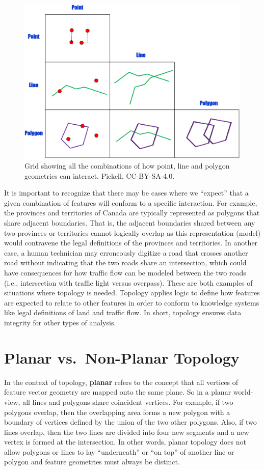 \documentclass[
]{book}
\begin{document}
\begin{figure}
\includegraphics[width=0.75\linewidth]{images/07-topology-grid} \caption{Grid showing all the combinations of how point, line and polygon geometries can interact. Pickell, CC-BY-SA-4.0.}\label{fig:7-topology-grid}
\end{figure}

It is important to recognize that there may be cases where we ``expect'' that a given combination of features will conform to a specific interaction. For example, the provinces and territories of Canada are typically represented as polygons that share adjacent boundaries. That is, the adjacent boundaries shared between any two provinces or territories cannot logically overlap as this representation (model) would contravene the legal definitions of the provinces and territories. In another case, a human technician may erroneously digitize a road that crosses another road without indicating that the two roads share an intersection, which could have consequences for how traffic flow can be modeled between the two roads (i.e., intersection with traffic light versus overpass). These are both examples of situations where topology is needed. Topology applies logic to define how features are expected to relate to other features in order to conform to knowledge systems like legal definitions of land and traffic flow. In short, topology ensures data integrity for other types of analysis.

\hypertarget{planar-vs.-non-planar-topology}{%
\section{Planar vs.~Non-Planar Topology}\label{planar-vs.-non-planar-topology}}

In the context of topology, \textbf{planar} refers to the concept that all vertices of feature vector geometry are mapped onto the same plane. So in a planar world-view, all lines and polygons share coincident vertices. For example, if two polygons overlap, then the overlapping area forms a new polygon with a boundary of vertices defined by the union of the two other polygons. Also, if two lines overlap, then the two lines are divided into four new segments and a new vertex is formed at the intersection. In other words, planar topology does not allow polygons or lines to lay ``underneath'' or ``on top'' of another line or polygon and feature geometries must always be distinct.
\end{document}
